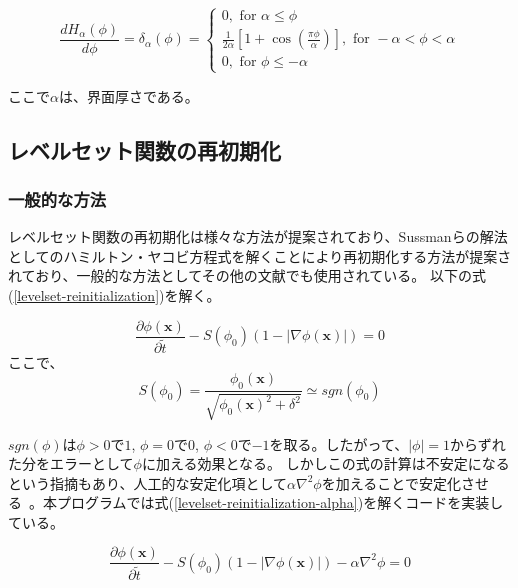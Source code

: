 \begin{equation}
\label{delta-function}
	\frac{d H_\alpha(\phi)}{d \phi} = \delta_\alpha(\phi) = \left\{\begin{array}{l}0, \text { for } \alpha \leq \phi \\ 
															\frac{1}{2 \alpha}\left[1+\cos \left(\frac{\pi \phi}{\alpha}\right)\right], \text { for }-\alpha<\phi<\alpha \\
															 0, \text { for } \phi \leq-\alpha\end{array}\right.
\end{equation}

ここで$\alpha$は、界面厚さである。



\subsection{レベルセット関数の再初期化}

\subsubsection{一般的な方法}

レベルセット関数の再初期化は様々な方法が提案されており、Sussmanらの解法としてのハミルトン・ヤコビ方程式を解くことにより再初期化する方法が提案されており\cite{Sussman1994}、一般的な方法としてその他の文献でも使用されている\cite{Himeno1999}。
以下の式(\ref{levelset-reinitialization})を解く。

\begin{equation}
\label{levelset-reinitialization}
	\frac{\partial \phi (\bm{x})}{\partial \tilde{t}} 
	 - S(\phi_{0})(1 - |\nabla \phi (\bm{x})|) = 0
\end{equation}
ここで、
\begin{equation}
\label{levelset-reinitialization}
	S(\phi_{0}) = \frac{\phi_{0} (\bm{x})}{\sqrt{\phi_{0}(\bm{x})^2 + \delta^2}} \simeq sgn(\phi_{0})
\end{equation}

$sgn(\phi)$は$\phi>0$で$1$, $\phi=0$で$0$, $\phi<0$で$-1$を取る。したがって、$|\phi|=1$からずれた分をエラーとして$\phi$に加える効果となる。
しかしこの式の計算は不安定になるという指摘もあり、人工的な安定化項として$\alpha \nabla^2 \phi$を加えることで安定化させる~\cite{Pimenta2018}。本プログラムでは式(\ref{levelset-reinitialization-alpha})を解くコードを実装している。

\begin{equation}
\label{levelset-reinitialization-alpha}
	\frac{\partial \phi (\bm{x})}{\partial \tilde{t}}
	- S(\phi_{0})(1 - |\nabla \phi (\bm{x})|) 
	- \alpha \nabla^2 \phi = 0
\end{equation}

